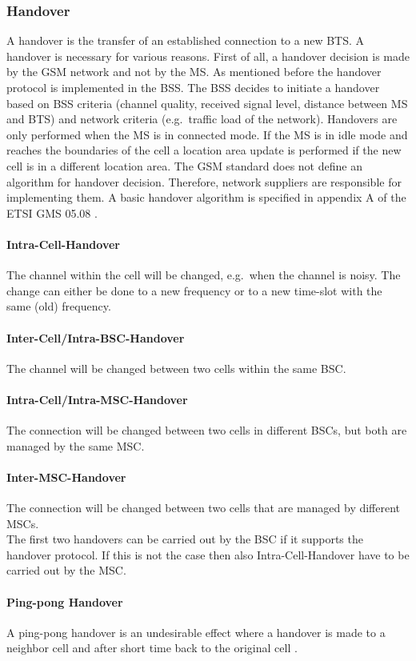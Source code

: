 \documentclass[master,english]{hgbthesis}
\begin{document}
\subsubsection{Handover}
A handover is the transfer of an established connection to a new BTS. A handover is necessary for various reasons. First of all, a handover decision is made by the GSM network and not by the MS. As mentioned before the handover protocol is implemented in the BSS. The BSS decides to initiate a handover based on BSS criteria (channel quality, received signal level, distance between MS and BTS) and network criteria (e.g.\ traffic load of the network).
Handovers are only performed when the MS is in connected mode. If the MS is in idle mode and reaches the boundaries of the cell a location area update is performed if the new cell is in a different location area.
The GSM standard does not define an algorithm for handover decision. Therefore, network suppliers are responsible for implementing them. A basic handover algorithm is specified in appendix A of the ETSI GMS 05.08 \cite{Etsi19942}.
\paragraph{Intra-Cell-Handover} The channel within the cell will be changed, e.g.\ when the channel is noisy. The change can either be done to a new frequency or to a new time-slot with the same (old) frequency.
\paragraph{Inter-Cell/Intra-BSC-Handover}
The channel will be changed between two cells within the same BSC.
\paragraph{Intra-Cell/Intra-MSC-Handover}
The connection will be changed between two cells in different BSCs, but both are managed by the same MSC.
\paragraph{Inter-MSC-Handover}
The connection will be changed between two cells that are managed by different MSCs.
\\
The first two handovers can be carried out by the BSC if it supports the handover protocol. If this is not the case then also Intra-Cell-Handover have to be carried out by the MSC.
\paragraph{Ping-pong Handover}
A ping-pong handover is an undesirable effect where a handover is made to a neighbor cell and after short time back to the original cell \cite{Junius1995}.
\end{document}
